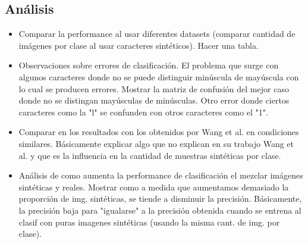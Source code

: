 \subsection{Análisis}
	\begin{itemize}
		\item Comparar la performance al usar diferentes datasets (comparar cantidad de imágenes por clase al usar caracteres sintéticos). Hacer una tabla.
		\item Observaciones sobre errores de clasificación. El problema que surge con algunos caracteres donde no se puede distinguir minúscula de mayúscula con lo cual se producen errores. Mostrar la matriz de confusión del mejor caso donde no se distingan mayúsculas de minúsculas. Otro error donde ciertos caracteres como la "l" se confunden con otros caracteres como el "1".
		\item Comparar en los resultados con los obtenidos por Wang et al. en condiciones similares. Básicamente explicar algo que no explican en su trabajo Wang et al. y que es la influencia en la cantidad de muestras sintéticas por clase.
		\item Análisis de como aumenta la performance de clasificación el mezclar imágenes sintéticas y reales. Mostrar como a medida que aumentamos demasiado la proporción de img. sintéticas, se tiende a disminuir la precisión. Básicamente, la precisión baja para "igualarse" a la precisión obtenida cuando se entrena al clasif con puras imagenes sintéticas (usando la misma cant. de img. por clase).
	\end{itemize}